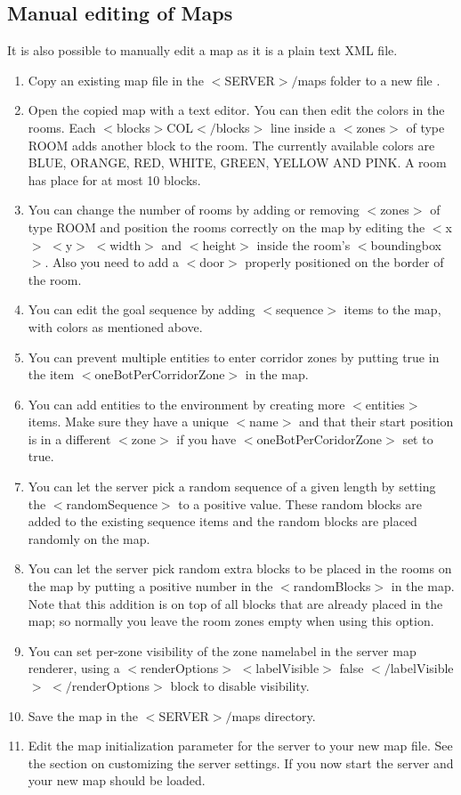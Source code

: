 \subsection{Manual editing of Maps}
It is also possible to manually edit a map as it is a plain text XML file.
\begin{enumerate}
\item Copy an existing map file in the $<$SERVER$>/$maps folder to a new file \footnotemark[1].
\item Open the copied map with a text editor. You can then edit the colors in the rooms. Each $<$blocks$>$COL$</$blocks$>$ line inside a $<$zones$>$ of type ROOM adds another block to the room. The currently available colors are BLUE, ORANGE, RED, WHITE, GREEN, YELLOW AND PINK. A room has place for at most 10 blocks.
\item You can change the number of rooms by adding or removing $<$zones$>$ of type ROOM and position the rooms correctly on the map by editing the $<$x$>$ $<$y$>$ $<$width$>$ and $<$height$>$ inside the room's $<$boundingbox$>$. Also you need to add a $<$door$>$ properly positioned on the border of the room.
\item You can edit the goal sequence by adding $<$sequence$>$ items to the map, with colors as mentioned above.
\item You can prevent multiple entities to enter corridor zones by putting true in the item $<$oneBotPerCorridorZone$>$ in the map.
\item You can add entities to the environment by creating more $<$entities$>$ items. Make sure they have a unique $<$name$>$ and that their start position is in a different $<$zone$>$ if you have $<$oneBotPerCoridorZone$>$ set to true.
\item You can let the server pick a random sequence of a given length by setting the $<$randomSequence$>$ to a positive value. These random blocks are added to the existing sequence items and the random blocks are placed randomly on the map.
\item You can let the server pick random extra blocks to be placed in the rooms on the map by putting a positive number in the $<$randomBlocks$>$ in the map. Note that this addition is on top of all blocks that are already placed in the map; so normally you leave the room zones empty when using this option.
\item You can set per-zone visibility of the zone namelabel in the server map renderer, using a $<$renderOptions$>$ $<$labelVisible$>$ false $</$labelVisible$>$ $</$renderOptions$>$ block to disable visibility.
\item Save the map in the $<$SERVER$>/$maps directory.
\item Edit the map initialization parameter for the server to your new map file. See the section on customizing the server settings. If you now start the server and your new map should be loaded.
\end{enumerate}


